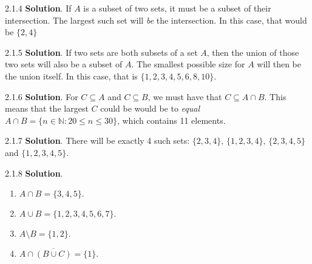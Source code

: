\documentclass[11pt,]{book}
\theoremstyle{ptxplainnotitle}
\theoremstyle{ptxplaintitle}
\theoremstyle{ptxdefinitionnotitle}
\theoremstyle{ptxdefinitiontitle}
\theoremstyle{ptxdefinitionnotitle}
\theoremstyle{ptxdefinitiontitle}
\theoremstyle{ptxdefinitionnotitle}
\theoremstyle{ptxdefinitiontitle}
\theoremstyle{ptxdefinitiontitlenonumber}
\theoremstyle{ptxdefinitiontitlenonumber}
\numberwithin{equation}{chapter}
\newcommand{\N}{\mathbb N}
\newcommand{\st}{:}
\renewcommand{\bar}{\overline}
\begin{document}
\begin{divisionexercise}{2.1.4}
\textbf{Solution}.\quad%
\hypertarget{p-826}{}%
If \(A\) is a subset of two sets, it must be a subset of their intersection.  The largest such set will \emph{be} the intersection.  In this case, that would be \(\{2,4\}\)%
\end{divisionexercise}%
\begin{divisionexercise}{2.1.5}
\textbf{Solution}.\quad%
\hypertarget{p-832}{}%
If two sets are both subsets of a set \(A\text{,}\) then the union of those two sets will also be a subset of \(A\text{.}\)  The smallest possible size for \(A\) will then be the union itself. In this case, that is \(\{1,2,3,4,5,6,8,10\}\text{.}\)%
\end{divisionexercise}%
\begin{divisionexercise}{2.1.6}
\textbf{Solution}.\quad%
\hypertarget{p-838}{}%
For \(C \subseteq A\) and \(C \subseteq B\text{,}\) we must have that \(C \subseteq A \cap B\text{.}\)  This means that the largest \(C\) could be would be to \emph{equal} \(A \cap B = \{n \in \N \st 20 \le n \le 30\}\text{,}\) which contains 11 elements.%
\end{divisionexercise}%
\begin{divisionexercise}{2.1.7}
\textbf{Solution}.\quad%
\hypertarget{p-846}{}%
There will be exactly 4 such sets: \(\{2, 3, 4\}\text{,}\) \(\{1,2,3,4\}\text{,}\) \(\{2,3,4,5\}\) and \(\{1,2,3,4,5\}\text{.}\)%
\end{divisionexercise}%
\begin{divisionexercise}{2.1.8}
\textbf{Solution}.\quad%
\hypertarget{p-866}{}%
\leavevmode%
\begin{enumerate}[label=\alph*.]
\item\hypertarget{li-386}{}\hypertarget{p-867}{}%
\(A \cap B = \{3,4,5\}\text{.}\)%
\item\hypertarget{li-387}{}\hypertarget{p-868}{}%
\(A \cup B = \{1,2,3,4,5,6,7\}\text{.}\)%
\item\hypertarget{li-388}{}\hypertarget{p-869}{}%
\(A \setminus B = \{1,2\}\text{.}\)%
\item\hypertarget{li-389}{}\hypertarget{p-870}{}%
\(A \cap \bar{(B \cup C)} = \{1\}\text{.}\)%
\end{enumerate}
%
\end{divisionexercise}%
\end{document}
